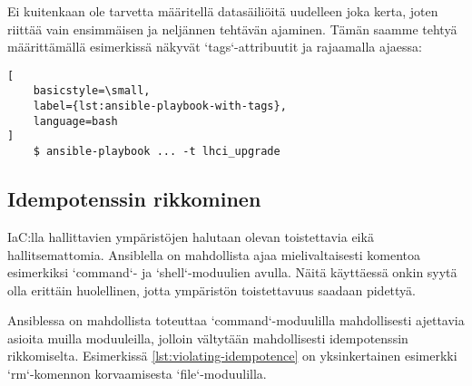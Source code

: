 

Ei kuitenkaan ole tarvetta määritellä datasäiliöitä uudelleen joka kerta, joten riittää vain
ensimmäisen ja neljännen tehtävän ajaminen. Tämän saamme tehtyä määrittämällä esimerkissä
näkyvät `tags`-attribuutit ja rajaamalla ajaessa:

\begin{lstlisting}[
    basicstyle=\small,
    label={lst:ansible-playbook-with-tags},
    language=bash
]
    $ ansible-playbook ... -t lhci_upgrade
\end{lstlisting}

\subsection{Idempotenssin rikkominen}

IaC:lla hallittavien ympäristöjen halutaan olevan toistettavia eikä hallitsemattomia.
Ansiblella on mahdollista ajaa mielivaltaisesti komentoa esimerkiksi `command`- ja
`shell`-moduulien avulla. Näitä käyttäessä onkin syytä olla erittäin huolellinen,
jotta ympäristön toistettavuus saadaan pidettyä. \parencite{KumaraIndika2021Tdad}

Ansiblessa on mahdollista toteuttaa `command`-moduulilla mahdollisesti ajettavia
asioita muilla moduuleilla, jolloin vältytään mahdollisesti idempotenssin rikkomiselta.
Esimerkissä \ref{lst:violating-idempotence} on yksinkertainen esimerkki `rm`-komennon
korvaamisesta `file`-moduulilla.


